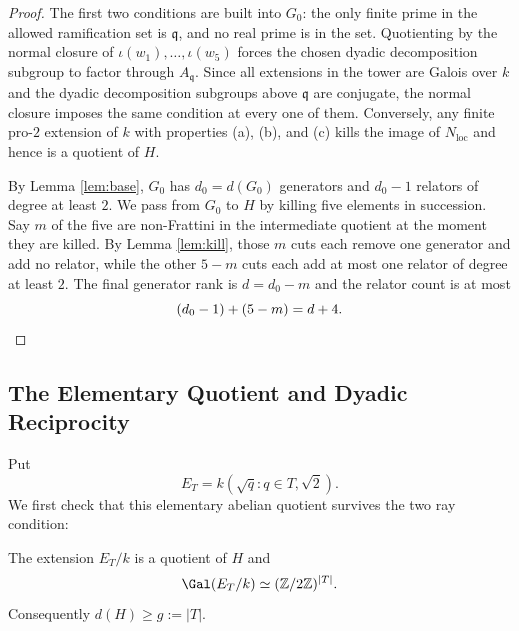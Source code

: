 \begin{proof}
The first two conditions are built into $G_0$: the only finite prime in the allowed ramification set is $\mathfrak{q}$, and no real prime is in the set.  Quotienting by the normal closure of $\iota(w_1),\dots,\iota(w_5)$ forces the chosen dyadic decomposition subgroup to factor through $A_{\mathfrak{q}}$.  Since all extensions in the tower are Galois over $k$ and the dyadic decomposition subgroups above $\mathfrak{q}$ are conjugate, the normal closure imposes the same condition at every one of them.  Conversely, any finite pro-$2$ extension of $k$ with properties (a), (b), and (c) kills the image of $N_{\mathrm{loc}}$ and hence is a quotient of $H$.

By Lemma \ref{lem:base}, $G_0$ has $d_0=d(G_0)$ generators and $d_0-1$ relators of degree at least $2$.  We pass from $G_0$ to $H$ by killing five elements in succession.  Say $m$ of the five are non-Frattini in the intermediate quotient at the moment they are killed.  By Lemma \ref{lem:kill}, those $m$ cuts each remove one generator and add no relator, while the other $5-m$ cuts each add at most one relator of degree at least $2$.  The final generator rank is $d=d_0-m$ and the relator count is at most
\[
   (d_0-1)+(5-m)=d+4.
   \qedhere
\]
\end{proof}

\subsection{The Elementary Quotient and Dyadic Reciprocity}

Put
\[
   E_T=k(\sqrt q:q\in T,\sqrt2).
\]
We first check that this elementary abelian quotient survives the two ray condition:

\begin{lemma}\label{lem:elementary}
The extension $E_T/k$ is a quotient of $H$ and
\[
   \Gal(E_T/k)\simeq(\mathbb{Z}/2\mathbb{Z})^{|T|}.
\]
Consequently $d(H)\geq g:=|T|$.
\end{lemma}


